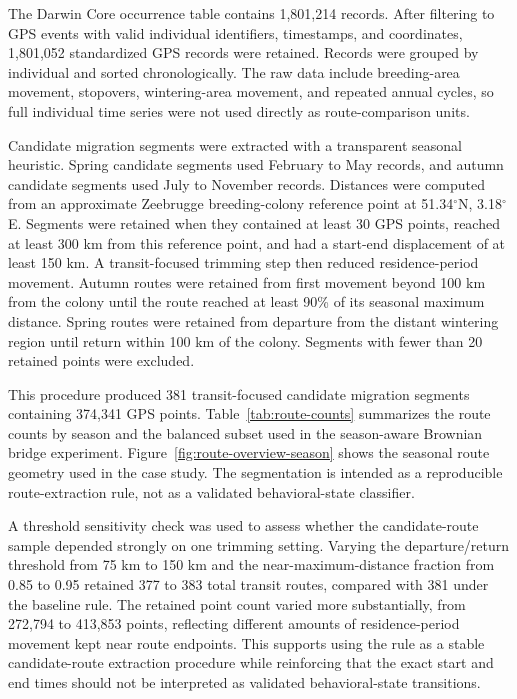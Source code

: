 The Darwin Core occurrence table contains 1,801,214 records. After filtering to GPS events with valid individual identifiers, timestamps, and coordinates, 1,801,052 standardized GPS records were retained. Records were grouped by individual and sorted chronologically. The raw data include breeding-area movement, stopovers, wintering-area movement, and repeated annual cycles, so full individual time series were not used directly as route-comparison units.

Candidate migration segments were extracted with a transparent seasonal heuristic. Spring candidate segments used February to May records, and autumn candidate segments used July to November records. Distances were computed from an approximate Zeebrugge breeding-colony reference point at 51.34\(^\circ\)N, 3.18\(^\circ\)E. Segments were retained when they contained at least 30 GPS points, reached at least 300 km from this reference point, and had a start-end displacement of at least 150 km. A transit-focused trimming step then reduced residence-period movement. Autumn routes were retained from first movement beyond 100 km from the colony until the route reached at least 90\% of its seasonal maximum distance. Spring routes were retained from departure from the distant wintering region until return within 100 km of the colony. Segments with fewer than 20 retained points were excluded.

This procedure produced 381 transit-focused candidate migration segments containing 374,341 GPS points. Table~\ref{tab:route-counts} summarizes the route counts by season and the balanced subset used in the season-aware Brownian bridge experiment. Figure~\ref{fig:route-overview-season} shows the seasonal route geometry used in the case study. The segmentation is intended as a reproducible route-extraction rule, not as a validated behavioral-state classifier.

A threshold sensitivity check was used to assess whether the candidate-route sample depended strongly on one trimming setting. Varying the departure/return threshold from 75 km to 150 km and the near-maximum-distance fraction from 0.85 to 0.95 retained 377 to 383 total transit routes, compared with 381 under the baseline rule. The retained point count varied more substantially, from 272,794 to 413,853 points, reflecting different amounts of residence-period movement kept near route endpoints. This supports using the rule as a stable candidate-route extraction procedure while reinforcing that the exact start and end times should not be interpreted as validated behavioral-state transitions.

